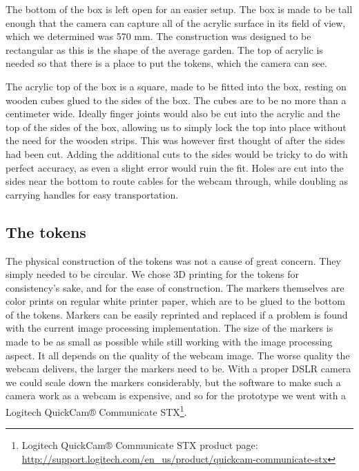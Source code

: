 The bottom of the box is left open for an easier setup.
The box is made to be tall enough that the camera can capture all of the acrylic surface in its field of view, which we determined was 570 mm.
The construction was designed to be rectangular as this is the shape of the average garden. %
The top of acrylic is needed so that there is a place to put the tokens, which the camera can see.

The acrylic top of the box is a square, made to be fitted into the box, resting on wooden cubes glued to the sides of the box. The cubes are to be no more than a centimeter wide. Ideally finger joints would also be cut into the acrylic and the top of the sides of the box, allowing us to simply lock the top into place without the need for the wooden strips. This was however first thought of after the sides had been cut. Adding the additional cuts to the sides would be tricky to do with perfect accuracy, as even a slight error would ruin the fit. 
Holes are cut into the sides near the bottom to route cables for the webcam through, while doubling as carrying handles for easy transportation. 

\subsection{The tokens}

The physical construction of the tokens was not a cause of great concern. They simply needed to be circular. We chose 3D printing for the tokens for consistency's sake, and for the ease of construction. The markers themselves are color prints on regular white printer paper, which are to be glued to the bottom of the tokens. Markers can be easily reprinted and replaced if a problem is found with the current image processing implementation. 
The size of the markers is made to be as small as possible while still working with the image processing aspect. It all depends on the quality of the webcam image. The worse quality the webcam delivers, the larger the markers need to be. With a proper DSLR camera we could scale down the markers considerably, but the software to make such a camera work as a webcam is expensive, and so for the prototype we went with a Logitech QuickCam® Communicate STX\footnote{Logitech QuickCam® Communicate STX product page: \url{http://support.logitech.com/en_us/product/quickcam-communicate-stx}}.\\

